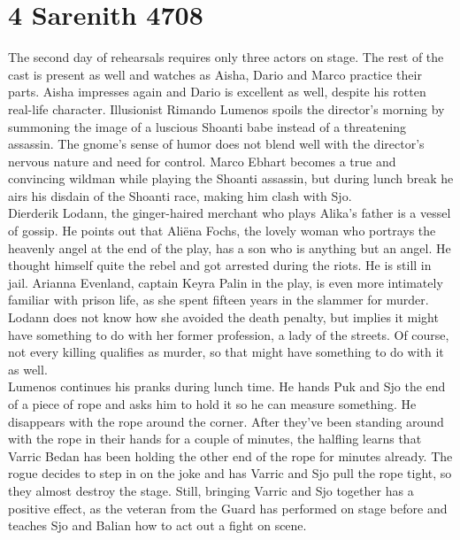 \section{4 Sarenith 4708}

The second day of rehearsals requires only three actors on stage. The rest of the cast is present as well and watches as Aisha, Dario and Marco practice their parts. Aisha impresses again and Dario is excellent as well, despite his rotten real-life character. Illusionist Rimando Lumenos spoils the director's morning by summoning the image of a luscious Shoanti babe instead of a threatening assassin. The gnome's sense of humor does not blend well with the director's nervous nature and need for control. Marco Ebhart becomes a true and convincing wildman while playing the Shoanti assassin, but during lunch break he airs his disdain of the Shoanti race, making him clash with Sjo.\\

Dierderik Lodann, the ginger-haired merchant who plays Alika's father is a vessel of gossip. He points out that Ali\"ena Fochs, the lovely woman who portrays the heavenly angel at the end of the play, has a son who is anything but an angel. He thought himself quite the rebel and got arrested during the riots. He is still in jail. Arianna Evenland, captain Keyra Palin in the play, is even more intimately familiar with prison life, as she spent fifteen years in the slammer for murder. Lodann does not know how she avoided the death penalty, but implies it might have something to do with her former profession, a lady of the streets. Of course, not every killing qualifies as murder, so that might have something to do with it as well.\\

Lumenos continues his pranks during lunch time. He hands Puk and Sjo the end of a piece of rope and asks him to hold it so he can measure something. He disappears with the rope around the corner. After they've been standing around with the rope in their hands for a couple of minutes, the halfling learns that Varric Bedan has been holding the other end of the rope for minutes already. The rogue decides to step in on the joke and has Varric and Sjo pull the rope tight, so they almost destroy the stage. Still, bringing Varric and Sjo together has a positive effect, as the veteran from the Guard has performed on stage before and teaches Sjo and Balian how to act out a fight on scene.\\


